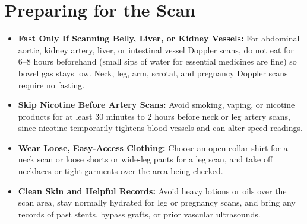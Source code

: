 \section{Preparing for the Scan}
\begin{itemize}
\item \textbf{Fast Only If Scanning Belly, Liver, or Kidney Vessels:} For abdominal aortic, kidney artery, liver, or intestinal vessel Doppler scans, do not eat for 6--8 hours beforehand (small sips of water for essential medicines are fine) so bowel gas stays low. Neck, leg, arm, scrotal, and pregnancy Doppler scans require no fasting.
\item \textbf{Skip Nicotine Before Artery Scans:} Avoid smoking, vaping, or nicotine products for at least 30 minutes to 2 hours before neck or leg artery scans, since nicotine temporarily tightens blood vessels and can alter speed readings.
\item \textbf{Wear Loose, Easy-Access Clothing:} Choose an open-collar shirt for a neck scan or loose shorts or wide-leg pants for a leg scan, and take off necklaces or tight garments over the area being checked.
\item \textbf{Clean Skin and Helpful Records:} Avoid heavy lotions or oils over the scan area, stay normally hydrated for leg or pregnancy scans, and bring any records of past stents, bypass grafts, or prior vascular ultrasounds.
\end{itemize}

